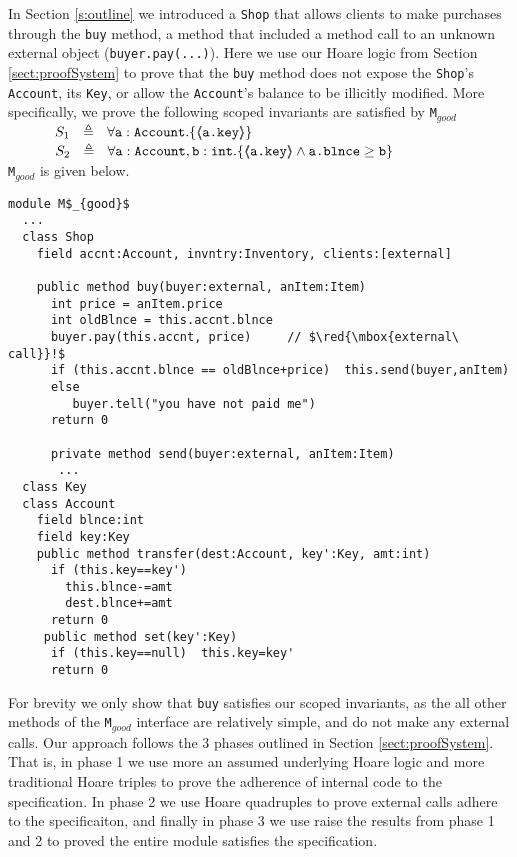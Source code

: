 In Section \ref{s:outline} we introduced a \verb|Shop| that allows clients to make purchases through the
\verb|buy| method, a method that included a method call to an unknown external object (\verb|buyer.pay(...)|).
Here we use our Hoare logic from Section \ref{sect:proofSystem} to prove that the \verb|buy| method
does not expose the \verb|Shop|'s  \verb|Account|, its \verb|Key|, or allow the \verb|Account|'s balance to be illicitly modified. 
More specifically, we prove the following scoped invariants are satisfied by \verb|M|$_{good}$\\
$\strut  \SPSP  S_1\ \  \triangleq \ \ \TwoStatesN  {\prg{a}:\prg{Account}}  {\inside{\prg{a.key}}} $ 
 \\
$\strut  \SPSP  S_2\ \  \triangleq \ \ \TwoStatesN{ \prg{a}:\prg{Account},\prg{b}:\prg{int} } {\inside{\prg{a.key}} \wedge \prg{a.\balance} \geq \prg{b} } $\\
\verb|M|$_{good}$ is given below.
\begin{lstlisting}[mathescape=true, language=Chainmail, frame=lines]
module M$_{good}$
  ...   
  class Shop
    field accnt:Account, invntry:Inventory, clients:[external]    
  
    public method buy(buyer:external, anItem:Item)
      int price = anItem.price
      int oldBlnce = this.accnt.blnce
      buyer.pay(this.accnt, price)     // $\red{\mbox{external\ call}}!$
      if (this.accnt.blnce == oldBlnce+price)  this.send(buyer,anItem)
      else
         buyer.tell("you have not paid me") 
      return 0
     
      private method send(buyer:external, anItem:Item)  
       ... 
  class Key
  class Account
    field blnce:int 
    field key:Key
    public method transfer(dest:Account, key':Key, amt:int)
      if (this.key==key')
        this.blnce-=amt
        dest.blnce+=amt
	  return 0
     public method set(key':Key)
      if (this.key==null)  this.key=key'
	  return 0
\end{lstlisting}

For brevity we only show that \verb|buy| satisfies our scoped invariants, as the all other methods of 
the \verb|M|$_{good}$ interface are relatively simple, and do not make any external calls. 
Our approach follows the 3 phases outlined in Section \ref{sect:proofSystem}. That is, in
phase 1 we use more an assumed underlying Hoare logic and more traditional Hoare triples to prove the adherence of internal code to
the specification. In phase 2 we use Hoare quadruples to prove external calls adhere
to the specificaiton, and finally in phase 3 we use raise the results from phase 1 and 2 to proved
the entire module satisfies the specification.

